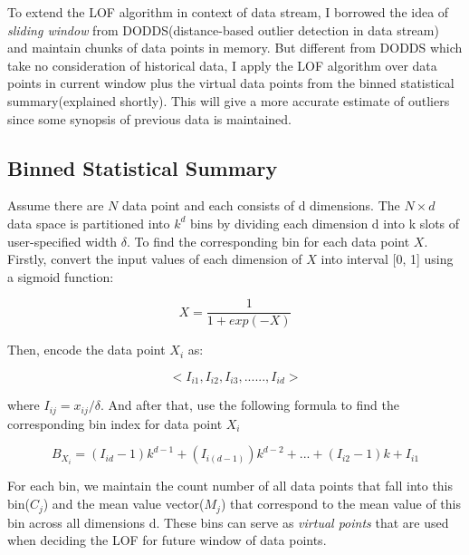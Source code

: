 \documentclass[11pt]{article}       %
\begin{document}
To extend the LOF algorithm in context of data stream, I borrowed the idea of \textit{sliding window} from DODDS(distance-based outlier detection in data stream) and maintain chunks of data points in memory. But different from DODDS which take no consideration of historical data, I apply the LOF algorithm over data points in current window plus the virtual data points from the binned statistical summary(explained shortly). This will give a more accurate estimate of outliers since some synopsis of previous data is maintained.

\subsection{Binned Statistical Summary} \label{subsect2}

Assume there are $N$ data point and each consists of d dimensions. The $N \times d$ data space is partitioned into $k^d$ bins by dividing each dimension d into k slots of user-specified width $\delta$. To find the corresponding bin for each data point $X$. Firstly, convert the input values of each dimension of $X$ into  interval [0, 1] using a sigmoid function:

\[ X = \frac{1}{1 + exp(-X)} \]

Then, encode the data point $X_i$ as:

\[ <I_{i1}, I_{i2}, I_{i3}, ......, I_{id}> \]

where $I_{ij} = x_{ij} / \delta$. And after that, use the following formula to find the corresponding bin index for data point $X_i$

\[ B_{X_{i}} = (I_{id} - 1)k^{d-1} + (I_{i(d-1)})k^{d-2} + ... + (I_{i2} -1)k + I_{i1} \]

For each bin, we maintain the count number of all data points that fall into this bin($C_j$) and the mean value vector($M_j$) that correspond to the mean value of this bin across all dimensions d. These bins can serve as \textit{virtual points} that are used when deciding the LOF for future window of data points.
\end{document}
